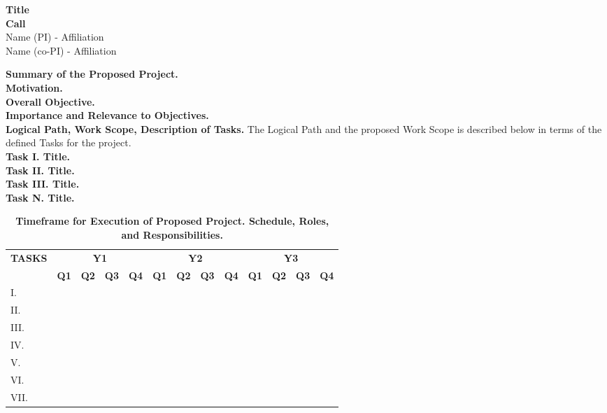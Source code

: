 \documentclass[11pt,letterpaper]{article}
\begin{document}
{\centering 
    \textbf{Title\\
    Call\\
    }
    Name (PI) - Affiliation\\
    Name (co-PI) - Affiliation 
\par
}
\vspace{\baselineskip}

\noindent\textbf{Summary of the Proposed Project.} 
\\

\noindent\textbf{Motivation.}
\\

\noindent\textbf{Overall Objective.}
\\

\noindent\textbf{Importance and Relevance to Objectives.}
\\

\noindent\textbf{Logical Path, Work Scope, Description of Tasks.} The Logical Path and the proposed Work Scope is described below in terms of the defined Tasks for the project.
\\

\noindent\textbf{Task I. Title.}
\\

\noindent\textbf{Task II. Title.}
\\

\noindent\textbf{Task III. Title.}
\\

\noindent\textbf{Task N. Title.}

\begin{table}[h!]
    \centering
    \caption*{\textbf{Timeframe for Execution of Proposed Project. Schedule, Roles, and Responsibilities.}}
    \begin{tabular}{|l|c|c|c|c|c|c|c|c|c|c|c|c|}
        \hline
        \multicolumn{1}{|c|}{\multirow{2}{*}{\textbf{TASKS}}}& 
        \multicolumn{4}{|c|}{\textbf{Y1}}&
        \multicolumn{4}{|c|}{\textbf{Y2}}&
        \multicolumn{4}{|c|}{\textbf{Y3}}\\
        \cline{2-13}
        &
        \textbf{Q1}& 
        \textbf{Q2}& 
        \textbf{Q3}& 
        \textbf{Q4}& 
        \textbf{Q1}& 
        \textbf{Q2}& 
        \textbf{Q3}& 
        \textbf{Q4}& 
        \textbf{Q1}& 
        \textbf{Q2}& 
        \textbf{Q3}& 
        \textbf{Q4}\\
        \hline
        I. & & & & & & & & & & & & \\
        \hline
        II. & & & & & & & & & & & & \\
        \hline
        III. & & & & & & & & & & & & \\
        \hline
        IV. & & & & & & & & & & & & \\
        \hline
        V. & & & & & & & & & & & & \\
        \hline
        VI. & & & & & & & & & & & & \\
        \hline
        VII. & & & & & & & & & & & & \\
        \hline
    \end{tabular}
    \label{tab-timeframe}
\end{table}
\end{document}

